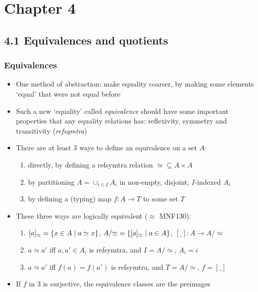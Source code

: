 \documentclass[handout]{beamer}
\title[INF223 presentations]{}
\begin{document}
\section{Chapter 4}
\subsection{4.1 Equivalences and quotients}
 
\frame
  {   
    \frametitle{Equivalences}\label{Ch4:Eqvs}

 \begin{itemize}[<+->]
\item One method of abstraction: make equality coarser, by making
some elements `equal' that were not equal before
\item Such a new `equality' called \emph{equivalence} should have some important 
properties that any equality relations has: reflexivity, symmetry and transitivity 
(\emph{refsymtra})
\item There are at least 3 ways to define an equivalence on a set $A$:
   \begin{enumerate}[<+->]
\item directly, by defining a refsymtra relation ${\simeq}\subseteq A\times A$
\item by partitioning $A = \cup_{i\in I} A_i $ in non-empty, disjoint, $I$-indexed $A_i$
\item by defining a (typing) map $f: A\to T$ to some set $T$
   \end{enumerate}
\item These three ways are logically equivalent ($\approx$ MNF130): 
   \begin{enumerate}[<+->]
\item $[a]_\simeq = \{x\in A\mid a\simeq x\}$, 
$A/{\simeq}=\{[a]_\simeq \mid a\in A\}$, $[\_] : A \to A/{\simeq}$
\item $a\simeq a' $ iff $a,a' \in A_i$ is refsymtra, and $I = A/{\simeq}$, $A_i = i$
\item $a\simeq a' $ iff $f(a)=f(a')$ is refsymtra, and  $T = A/{\simeq}$, $f=[\_]$
   \end{enumerate}
\item If $f$ in 3 is surjective, the equivalence classes are the preimages
 \end{itemize}

 }
\end{document}
